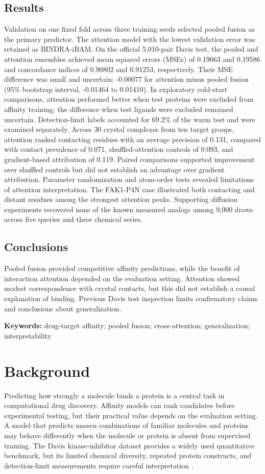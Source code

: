 \documentclass[12pt,a4paper]{article}
\begin{document}
\subsection*{Results}
Validation on one fixed fold across three training seeds selected pooled fusion as the primary predictor. The attention model with the lowest validation error was retained as BINDRA-iBAM. On the official 5,010-pair Davis test, the pooled and attention ensembles achieved mean squared errors (MSEs) of 0.19663 and 0.19586 and concordance indices of 0.90802 and 0.91253, respectively. Their MSE difference was small and uncertain: -0.00077 for attention minus pooled fusion (95\% bootstrap interval, -0.01464 to 0.01410). In exploratory cold-start comparisons, attention performed better when test proteins were excluded from affinity training; the difference when test ligands were excluded remained uncertain. Detection-limit labels accounted for 69.2\% of the warm test and were examined separately. Across 30 crystal complexes from ten target groups, attention ranked contacting residues with an average precision of 0.131, compared with contact prevalence of 0.071, shuffled-attention controls of 0.093, and gradient-based attribution of 0.119. Paired comparisons supported improvement over shuffled controls but did not establish an advantage over gradient attribution. Parameter randomization and atom-order tests revealed limitations of attention interpretation. The FAK1-P4N case illustrated both contacting and distant residues among the strongest attention peaks. Supporting diffusion experiments recovered none of the known measured analogs among 9,000 draws across five queries and three chemical series.

\subsection*{Conclusions}
Pooled fusion provided competitive affinity predictions, while the benefit of interaction attention depended on the evaluation setting. Attention showed modest correspondence with crystal contacts, but this did not establish a causal explanation of binding. Previous Davis test inspection limits confirmatory claims and conclusions about generalization.

\textbf{Keywords:} drug-target affinity; pooled fusion; cross-attention; generalization; interpretability

\section*{Background}
Predicting how strongly a molecule binds a protein is a central task in computational drug discovery. Affinity models can rank candidates before experimental testing, but their practical value depends on the evaluation setting. A model that predicts unseen combinations of familiar molecules and proteins may behave differently when the molecule or protein is absent from supervised training. The Davis kinase-inhibitor dataset provides a widely used quantitative benchmark, but its limited chemical diversity, repeated protein constructs, and detection-limit measurements require careful interpretation \citep{davis2011}.
\end{document}
